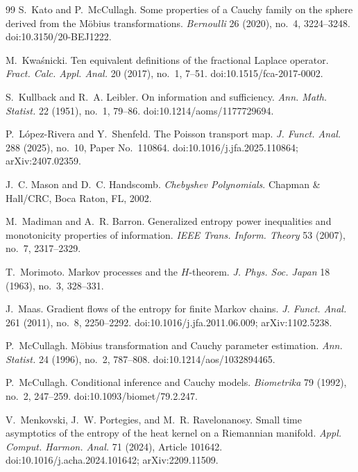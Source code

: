 \begin{thebibliography}{99}
S.~Kato and P.~McCullagh.
\newblock Some properties of a Cauchy family on the sphere derived from the
M{\"o}bius transformations.
\newblock \emph{Bernoulli} 26 (2020), no.~4, 3224--3248.
\newblock doi:10.3150/20-BEJ1222.

M.~Kwa{\'s}nicki.
\newblock Ten equivalent definitions of the fractional Laplace operator.
\newblock \emph{Fract. Calc. Appl. Anal.} 20 (2017), no.~1, 7--51.
\newblock doi:10.1515/fca-2017-0002.

S.~Kullback and R.~A. Leibler.
\newblock On information and sufficiency.
\newblock \emph{Ann. Math. Statist.} 22 (1951), no.~1, 79--86.
\newblock doi:10.1214/aoms/1177729694.

P.~L{\'o}pez-Rivera and Y.~Shenfeld.
\newblock The Poisson transport map.
\newblock \emph{J. Funct. Anal.} 288 (2025), no.~10, Paper No.~110864.
\newblock doi:10.1016/j.jfa.2025.110864; arXiv:2407.02359.

J.~C. Mason and D.~C. Handscomb.
\newblock \emph{Chebyshev Polynomials}.
\newblock Chapman \& Hall/CRC, Boca Raton, FL, 2002.

M.~Madiman and A.~R. Barron.
\newblock Generalized entropy power inequalities and monotonicity properties
of information.
\newblock \emph{IEEE Trans. Inform. Theory} 53 (2007), no.~7, 2317--2329.

T.~Morimoto.
\newblock Markov processes and the \(H\)-theorem.
\newblock \emph{J. Phys. Soc. Japan} 18 (1963), no.~3, 328--331.

J.~Maas.
\newblock Gradient flows of the entropy for finite Markov chains.
\newblock \emph{J. Funct. Anal.} 261 (2011), no.~8, 2250--2292.
\newblock doi:10.1016/j.jfa.2011.06.009; arXiv:1102.5238.

P.~McCullagh.
\newblock M{\"o}bius transformation and Cauchy parameter estimation.
\newblock \emph{Ann. Statist.} 24 (1996), no.~2, 787--808.
\newblock doi:10.1214/aos/1032894465.

P.~McCullagh.
\newblock Conditional inference and Cauchy models.
\newblock \emph{Biometrika} 79 (1992), no.~2, 247--259.
\newblock doi:10.1093/biomet/79.2.247.

V.~Menkovski, J.~W. Portegies, and M.~R. Ravelonanosy.
\newblock Small time asymptotics of the entropy of the heat kernel on a
{R}iemannian manifold.
\newblock \emph{Appl. Comput. Harmon. Anal.} 71 (2024), Article 101642.
\newblock doi:10.1016/j.acha.2024.101642; arXiv:2209.11509.


\end{thebibliography}
